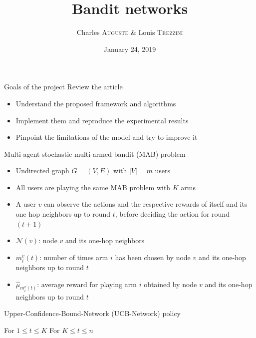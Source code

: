 \documentclass{beamer}
\title{Bandit networks}
\date{January 24, 2019}
\author{Charles \textsc{Auguste} \& Louis \textsc{Trezzini}}
\begin{document}
\maketitle

\begin{frame}{Goals of the project}
Review the article 

\begin{itemize}
  \item Understand the proposed framework and algorithms
  \item Implement them and reproduce the experimental results
  \item Pinpoint the limitations of the model and try to improve it
\end{itemize}
\end{frame}

\begin{frame}{Multi-agent stochastic multi-armed bandit (MAB) problem}
\begin{itemize}
  \item Undirected graph $G = (V, E)$ with $|V| = m$ users
  \item All users are playing the \alert{same} MAB problem with $K$ arms
  \item A user $v$ can observe the actions and the respective rewards of itself and its one hop neighbors up to round $t$, before deciding the action for round $(t+1)$
  \item $\mathcal{N}(v)$: node $v$ and its one-hop neighbors
  \item $m^v_i(t)$: number of times arm $i$ has been chosen by node $v$ and its one-hop neighbors up to round $t$
  \item $\hat{\mu}_{m_i^v(t)}$: average reward for playing arm $i$ obtained by node $v$ and its one-hop neighbors up to round $t$
\end{itemize}

\end{frame}

\begin{frame}{Upper-Confidence-Bound-Network (UCB-Network) policy}
  \begin{algorithmic}
      For $1 \leq t \leq K$
      For $K \leq t \leq n$
  \end{algorithmic}
\end{frame}
\end{document}
